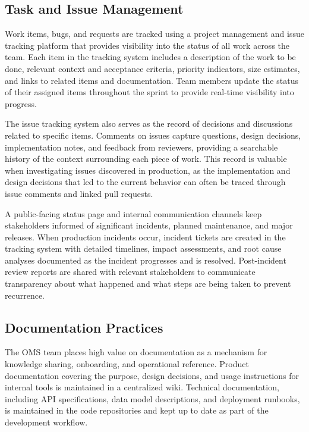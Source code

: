 \subsection{Task and Issue Management}

Work items, bugs, and requests are tracked using a project management and issue tracking platform that provides visibility into the status of all work across the team. Each item in the tracking system includes a description of the work to be done, relevant context and acceptance criteria, priority indicators, size estimates, and links to related items and documentation. Team members update the status of their assigned items throughout the sprint to provide real-time visibility into progress.

The issue tracking system also serves as the record of decisions and discussions related to specific items. Comments on issues capture questions, design decisions, implementation notes, and feedback from reviewers, providing a searchable history of the context surrounding each piece of work. This record is valuable when investigating issues discovered in production, as the implementation and design decisions that led to the current behavior can often be traced through issue comments and linked pull requests.

A public-facing status page and internal communication channels keep stakeholders informed of significant incidents, planned maintenance, and major releases. When production incidents occur, incident tickets are created in the tracking system with detailed timelines, impact assessments, and root cause analyses documented as the incident progresses and is resolved. Post-incident review reports are shared with relevant stakeholders to communicate transparency about what happened and what steps are being taken to prevent recurrence.

\subsection{Documentation Practices}

The OMS team places high value on documentation as a mechanism for knowledge sharing, onboarding, and operational reference. Product documentation covering the purpose, design decisions, and usage instructions for internal tools is maintained in a centralized wiki. Technical documentation, including API specifications, data model descriptions, and deployment runbooks, is maintained in the code repositories and kept up to date as part of the development workflow.


